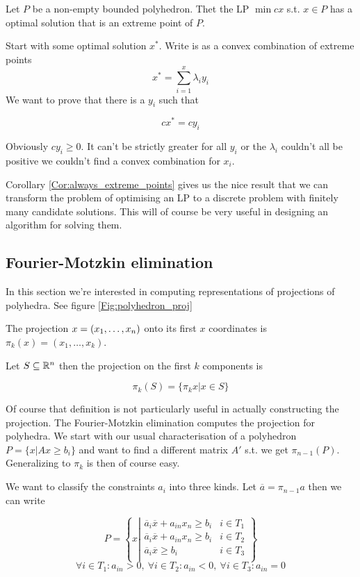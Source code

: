 \begin{cor}\label{Cor:always_extreme_points} Let $P$ be a non-empty bounded polyhedron. Thet the LP $\min cx$ s.t. $x\in P$ has a optimal solution that is an extreme point of $P$.
\end{cor}

\begin{pr} Start with some optimal solution $x^*$. Write is as a convex combination of extreme points 
\[x^* = \sum_{i=1}^x \lambda_i y_i\]
We want to prove that there is a $y_i$ such that

\[cx^* = cy_i\]

Obviously $cy_i\geq 0$. It can't be strictly greater for all $y_i$ or the $\lambda_i$ couldn't all be positive we couldn't find a convex combination for $x_i$. 
\end{pr}

Corollary \ref{Cor:always_extreme_points} gives us the nice result that we can transform the problem of optimising an LP to a discrete problem with finitely many candidate solutions. This will of course be very useful in designing an algorithm for solving them.

\subsection*{Fourier-Motzkin elimination}

In this section we're interested in computing representations of projections of polyhedra. See figure \ref{Fig:polyhedron_proj}

\begin{Def} The projection $x=({x}_1,\ldots,{x}_n)$ onto its first $x$ coordinates is $\pi_k(x) = (x_1,\ldots, x_k)$. 

Let $S\subseteq \mathbb{R}^n$ then the projection on the first $k$ components is

\[\pi_k(S)=\{\pi_k{x}|x\in S\}\]
\end{Def}

Of course that definition is not particularly useful in actually constructing the projection. The Fourier-Motzkin elimination computes the projection for polyhedra. We start with our usual characterisation of a polyhedron $P=\{x|Ax\geq b_i\}$ and want to find a different matrix $A'$ s.t. we get $\pi_{n-1}(P)$. Generalizing to $\pi_k$ is then of course easy.

We want to classify the constraints $a_i$ into three kinds. Let $\overline a = \pi_{n-1}a$ then we can write  

\[P=\left\{x\left| \begin{array}{cr}
\overline a_i\overline x +a_{in}x_n \geq b_i & i\in T_1\\
\overline a_i\overline x +a_{in}x_n \geq b_i & i\in T_2\\
\overline a_i\overline x \geq b_i & i\in T_3\\
\end{array}\right.\right\}\]
\[\forall i\in T_1: a_{in}>0,\ \forall i\in T_2: a_{in}<0,\ \forall i\in T_3: a_{in}=0 \]


